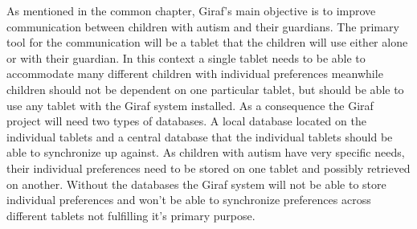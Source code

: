 As mentioned in the common chapter, Giraf's main objective is to improve communication between children with autism and their guardians. The primary tool for the communication will be a tablet that the children will use either alone or with their guardian. In this context a single tablet needs to be able to accommodate many different children with individual preferences meanwhile children should not be dependent on one particular tablet, but should be able to use any tablet with the Giraf system installed. 
As a consequence the Giraf project will need two types of databases. A local database located on the individual tablets and a central database that the individual tablets should be able to synchronize up against. As children with autism have very specific needs, their individual preferences need to be stored on one tablet and possibly retrieved on another. Without the databases the Giraf system will not be able to store individual preferences and won't be able to synchronize preferences across different tablets not fulfilling it's primary purpose.